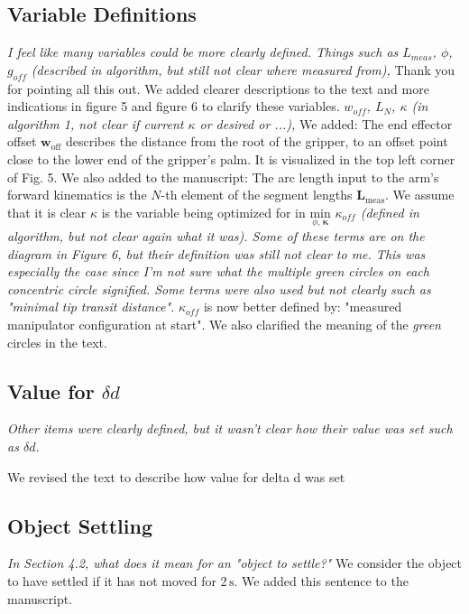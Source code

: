 \documentclass[letterpaper, 10 pt, twocolumn, conference]{article}
\newcommand{\unit}[1]{\ensuremath{\, \mathrm{#1}}} %
\begin{document}
\subsection{Variable Definitions}
\textit{I feel like many variables could be more clearly defined. Things such as $L_{meas}$, $\phi$, $g_{off}$ (described in algorithm, but still not clear where measured from),}
%
Thank you for pointing all this out. We added clearer descriptions to the text and more indications in figure 5 and figure 6 to clarify these variables.
%
\textit{$w_{off}$, $L_N$, $\kappa$ (in algorithm 1, not clear if current $\kappa$ or desired or ...),}
%
We added: The end effector offset $\mathbf{w}_{\textrm{off}}$ describes the distance from the root of the gripper, to an offset point close to the lower end of the gripper's palm. It is visualized in the top left corner of Fig. 5.
We also added to the manuscript: The arc length input to the arm's forward kinematics is the $N$-th element of the segment lengths $\mathbf{L}_{\textrm{meas}}$.
%
We assume that it is clear 
$\kappa$ is the variable being optimized for in $\underset{\phi, \, \boldsymbol{\kappa}}{\text{min}}$
%
\textit{$\kappa_{off}$ (defined in algorithm, but not clear again what it was). Some of these terms are on the diagram in Figure 6, but their definition was still not clear to me. This was especially the case since I'm not sure what the multiple green circles on each concentric circle signified. Some terms were also used but not clearly such as "minimal tip transit distance".}
%
$\kappa_{off}$  is now better defined by: "measured manipulator configuration at start". We also clarified the meaning of the \emph{green} circles in the text.
%

%
\subsection{Value for $\delta d$}
\textit{Other items were clearly defined, but it wasn't clear how their value was set such as $\delta d$.}

We revised the text to describe how value for delta d was set

\subsection{Object Settling}
\textit{In Section 4.2, what does it mean for an "object to settle?"}
%
We consider the object to have settled if it has not moved for 2\unit{s}. We added this sentence to the manuscript.
%
\end{document}
